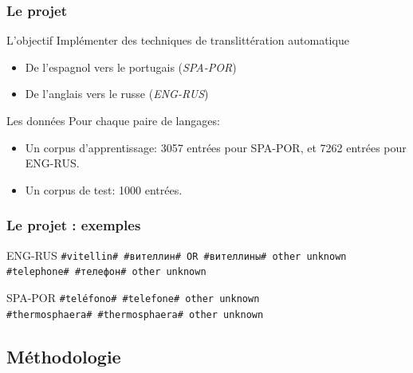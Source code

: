 \documentclass{beamer}
\begin{document}
\begin{frame}
\frametitle{Le projet}

	\begin{block}{L'objectif}
		Implémenter des techniques de translittération automatique
		\begin{itemize}
            \item De l'espagnol vers le portugais (\emph{SPA-POR})
            \item De l'anglais vers le russe (\emph{ENG-RUS})
		\end{itemize}
	\end{block}

	\begin{block}{Les données}
	Pour chaque paire de langages:		
		\begin{itemize}
            \item Un corpus d'apprentissage: 3057 entrées pour SPA-POR, et 7262 entrées pour ENG-RUS.
		\item Un corpus de test: 1000 entrées.
		\end{itemize}		
	\end{block}

\end{frame}

\begin{frame}[fragile]
\frametitle{Le projet : exemples}
\begin{block}{ENG-RUS}
\foreignlanguage{russian}{
\texttt{\#vitellin\# \#вителлин\# OR \#вителлины\#	other unknown}\\
\texttt{\#telephone\# \#телефон\# other unknown} }
\end{block}
\begin{block}{SPA-POR}
\texttt{\#teléfono\# \#telefone\#	other	unknown}\\
\texttt{\#thermosphaera\# \#thermosphaera\#	other	unknown}
\end{block}
\end{frame}

\subsection{Méthodologie}
\end{document}
